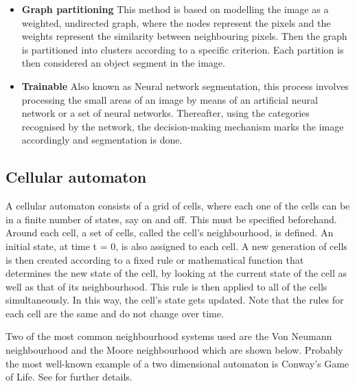 \documentclass[a4paper,10pt]{article}
\begin{document}
\begin{itemize}
 \item \textbf{Graph partitioning} This method is based on modelling
the image as a weighted, undirected graph, where the nodes represent the pixels
and the weights represent the similarity between neighbouring pixels. Then the
graph is partitioned into clusters according to a specific criterion.  Each
partition is then considered an object segment in the image.       
 \item \textbf{Trainable} Also known as Neural network segmentation,
this process involves processing the small areas of an image by means of an
artificial neural network or a set of neural networks.  Thereafter, using the
categories recognised by the network, the decision-making mechanism marks the
image accordingly and segmentation is done.
\end{itemize}

\subsection{Cellular automaton}
A cellular automaton consists of a grid of cells, where each one of the cells
can be in a finite number of states, say on and off.  This must be specified
beforehand.  Around each cell, a set of cells, called the cell's neighbourhood,
is defined.  An initial state, at time t = 0, is also assigned to each cell.  A
new generation of cells is then created according to a fixed rule or
mathematical function that determines the new state of the cell, by looking at
the current state of the cell as well as that of its neighbourhood.  This rule
is then applied to all of the cells simultaneously.  In this way, the cell's
state gets updated.  Note that the rules for each cell are the same and do not
change over time.  

Two of the most common neighbourhood systems used are the Von
Neumann neighbourhood and the Moore neighbourhood which are shown below. 
Probably the most well-known example of a two dimensional automaton is Conway's
Game of Life.  See \cite{gol} for further details.
\end{document}

